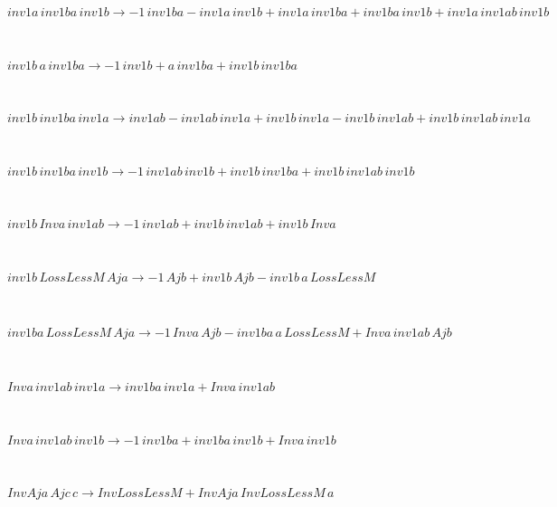 \begin{minipage}{6in}
$
inv1a\,
 inv1ba\,
 inv1b\rightarrow -1\,
 inv1ba - inv1a\,
 inv1b + inv1a\,
 inv1ba + inv1ba\,
 inv1b + inv1a\,
 inv1ab\,
 inv1b
$
\end{minipage}\medskip \\
\begin{minipage}{6in}
$
inv1b\,
 a\,
 inv1ba\rightarrow -1\,
 inv1b + a\,
 inv1ba + inv1b\,
 inv1ba
$
\end{minipage}\medskip \\
\begin{minipage}{6in}
$
inv1b\,
 inv1ba\,
 inv1a\rightarrow inv1ab - inv1ab\,
 inv1a + inv1b\,
 inv1a - inv1b\,
 inv1ab + inv1b\,
 inv1ab\,
 inv1a
$
\end{minipage}\medskip \\
\begin{minipage}{6in}
$
inv1b\,
 inv1ba\,
 inv1b\rightarrow -1\,
 inv1ab\,
 inv1b + inv1b\,
 inv1ba + inv1b\,
 inv1ab\,
 inv1b
$
\end{minipage}\medskip \\
\begin{minipage}{6in}
$
inv1b\,
 Inva\,
 inv1ab\rightarrow -1\,
 inv1ab + inv1b\,
 inv1ab + inv1b\,
 Inva
$
\end{minipage}\medskip \\
\begin{minipage}{6in}
$
inv1b\,
 LossLessM\,
 Aja\rightarrow -1\,
 Ajb + inv1b\,
 Ajb - inv1b\,
 a\,
 LossLessM
$
\end{minipage}\medskip \\
\begin{minipage}{6in}
$
inv1ba\,
 LossLessM\,
 Aja\rightarrow -1\,
 Inva\,
 Ajb - inv1ba\,
 a\,
 LossLessM + Inva\,
 inv1ab\,
 Ajb
$
\end{minipage}\medskip \\
\begin{minipage}{6in}
$
Inva\,
 inv1ab\,
 inv1a\rightarrow inv1ba\,
 inv1a + Inva\,
 inv1ab
$
\end{minipage}\medskip \\
\begin{minipage}{6in}
$
Inva\,
 inv1ab\,
 inv1b\rightarrow -1\,
 inv1ba + inv1ba\,
 inv1b + Inva\,
 inv1b
$
\end{minipage}\medskip \\
\begin{minipage}{6in}
$
InvAja\,
 Ajc\,
 c\rightarrow InvLossLessM + InvAja\,
 InvLossLessM\,
 a
$
\end{minipage}\medskip \\
